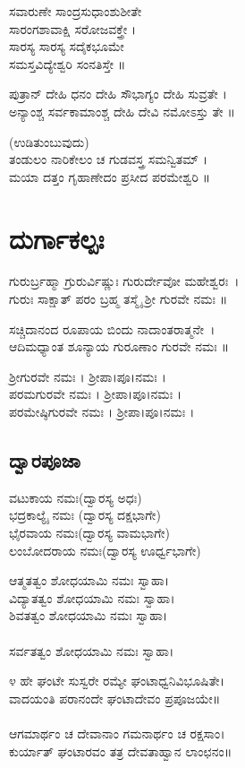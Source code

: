 ಸವಾರುಣೇ ಸಾಂದ್ರಸುಧಾಂಶುಶೀತೇ\\ ಸಾರಂಗಶಾವಾಕ್ಷಿ ಸರೋಜವಕ್ತ್ರೇ ।\\
ಸಾರಸ್ಯ ಸಾರಸ್ಯ ಸದೈಕಭೂಮೇ\\ ಸಮಸ್ತವಿದ್ಯೇಶ್ವರಿ ಸಂನತಿಸ್ತೇ ॥

ಪುತ್ರಾನ್ ದೇಹಿ ಧನಂ ದೇಹಿ ಸೌಭಾಗ್ಯಂ ದೇಹಿ ಸುವ್ರತೇ ।\\
ಅನ್ಯಾಂಶ್ಚ ಸರ್ವಕಾಮಾಂಶ್ಚ ದೇಹಿ ದೇವಿ ನಮೋಽಸ್ತು ತೇ ॥

(ಉಡಿತುಂಬುವುದು)\\
ತಂಡುಲಂ ನಾರಿಕೇಲಂ ಚ ಗುಡವಸ್ತ್ರ ಸಮನ್ವಿತಮ್ ।\\
ಮಯಾ ದತ್ತಂ ಗೃಹಾಣೇದಂ ಪ್ರಸೀದ ಪರಮೇಶ್ವರಿ ॥

\chapter*{\center ದುರ್ಗಾಕಲ್ಪಃ}
ಗುರುರ್ಬ್ರಹ್ಮಾ ಗ್ರುರುರ್ವಿಷ್ಣುಃ ಗುರುರ್ದೇವೋ ಮಹೇಶ್ವರಃ~।\\
ಗುರುಃ ಸಾಕ್ಷಾತ್ ಪರಂ ಬ್ರಹ್ಮ ತಸ್ಮೈ ಶ್ರೀ ಗುರವೇ ನಮಃ ॥

ಸಚ್ಚಿದಾನಂದ ರೂಪಾಯ ಬಿಂದು ನಾದಾಂತರಾತ್ಮನೇ~।\\
ಆದಿಮಧ್ಯಾಂತ ಶೂನ್ಯಾಯ ಗುರೂಣಾಂ ಗುರವೇ ನಮಃ ॥

ಶ್ರೀಗುರವೇ ನಮಃ ।  ಶ್ರೀಪಾ।ಪೂ।ನಮಃ ।\\
ಪರಮಗುರವೇ ನಮಃ ।  ಶ್ರೀಪಾ।ಪೂ।ನಮಃ ।\\
ಪರಮೇಷ್ಠಿಗುರವೇ ನಮಃ ।  ಶ್ರೀಪಾ।ಪೂ।ನಮಃ ।

\section{ದ್ವಾರಪೂಜಾ}
 ವಟುಕಾಯ ನಮಃ(ದ್ವಾರಸ್ಯ ಅಧಃ)\\
 ಭದ್ರಕಾಲ್ಯೈ ನಮಃ (ದ್ವಾರಸ್ಯ ದಕ್ಷಭಾಗೇ)\\
 ಭೈರವಾಯ ನಮಃ(ದ್ವಾರಸ್ಯ ವಾಮಭಾಗೇ)\\
 ಲಂಬೋದರಾಯ ನಮಃ(ದ್ವಾರಸ್ಯ ಊರ್ಧ್ವಭಾಗೇ)

 ಆತ್ಮತತ್ವಂ ಶೋಧಯಾಮಿ ನಮಃ ಸ್ವಾಹಾ।\\
 ವಿದ್ಯಾತತ್ವಂ ಶೋಧಯಾಮಿ ನಮಃ ಸ್ವಾಹಾ।\\
 ಶಿವತತ್ವಂ ಶೋಧಯಾಮಿ ನಮಃ ಸ್ವಾಹಾ।\\
\\ ಸರ್ವತತ್ವಂ ಶೋಧಯಾಮಿ ನಮಃ ಸ್ವಾಹಾ।

೪ ಹೇ ಘಂಟೇ ಸುಸ್ವರೇ ರಮ್ಯೇ ಘಂಟಾಧ್ವನಿವಿಭೂಷಿತೇ।\\
ವಾದಯಂತಿ ಪರಾನಂದೇ ಘಂಟಾದೇವಂ ಪ್ರಪೂಜಯೇ॥\\
\\
ಆಗಮಾರ್ಥಂ ಚ ದೇವಾನಾಂ ಗಮನಾರ್ಥಂ ಚ ರಕ್ಷಸಾಂ।\\
ಕುರ್ಯಾತ್ ಘಂಟಾರವಂ ತತ್ರ ದೇವತಾಹ್ವಾನ ಲಾಂಛನಂ॥

